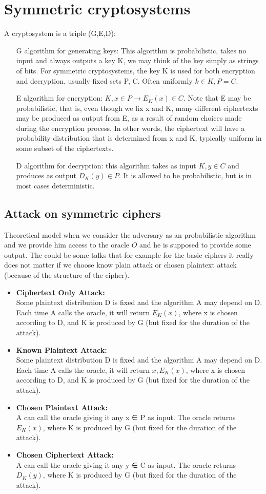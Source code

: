 \documentclass[a4paper,10pt]{article}
\begin{document}
\section*{Symmetric cryptosystems}
A cryptosystem is a triple (G,E,D):
\begin{itemize}
\item[G] algorithm for generating keys: This algorithm is probabilistic, takes no input and always outputs a key K, we may think of the key simply as strings of bits. For symmetric cryptosystems, the key K is used for both encryption and decryption. usually fixed sets P, C. Often uniformly $k \in K, P=C$.
\item[E] algorithm for encryption: $K, x \in P \rightarrow E_K(x) \in C$. Note that E may be probabilistic, that is, even though we fix x and K, many different ciphertexts may be produced as output from E, as a result of random choices made during the encryption process. In other words, the ciphertext will have a probability distribution that is
determined from x and K, typically uniform in some subset of the ciphertexts. 
\item[D] algorithm for decryption: this algorithm takes as input $K,y \in C$ and produces as output
$D_K(y) \in P$. It is allowed to be probabilistic, but is in most cases deterministic.
\end{itemize}
\subsection*{Attack on symmetric ciphers}
Theoretical model when we consider the adversary as an probabilistic algorithm and we provide him access to the oracle $O$ and he is supposed to provide some output. The could be some talks that for example for the basic ciphers it really does not matter if we choose know plain attack or chosen plaintext attack (because of the structure of the cipher). 
\begin{itemize}
\item
\textbf{Ciphertext Only Attack:}\\ Some plaintext distribution D is fixed and the algorithm A may depend on D. Each time A calls the oracle, it will return $E_K(x)$, where x is chosen according to D, and K is produced by G (but fixed for the duration of the attack).
\item 
\textbf{Known Plaintext Attack:}\\ Some plaintext distribution D is fixed and the algorithm A may depend on D. Each time A calls the oracle, it will return $x,E_K(x)$, where x is chosen according to D, and K is produced by G (but fixed for the duration of the attack).
\item 
\textbf{Chosen Plaintext Attack:}\\ A can call the oracle giving it any x ∈ P as input. The oracle returns $E_K(x)$, where K is produced by G (but fixed for the duration of the attack).
\item 
\textbf{Chosen Ciphertext Attack: }\\ A can call the oracle giving it any y ∈ C as input. The oracle returns $D_K(y)$, where K is produced by G (but fixed for the duration of the attack).
\end{itemize}
\end{document}

